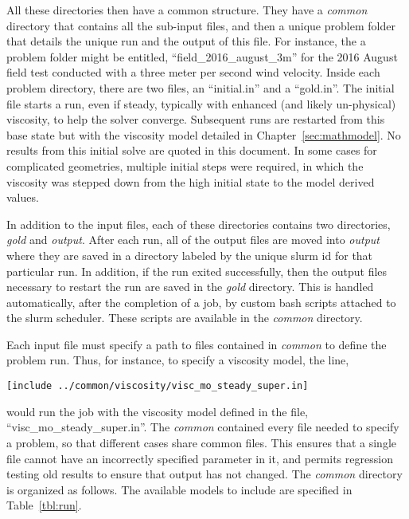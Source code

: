 All these directories then have a common structure. They have a {\it
common} directory that contains all the sub-input files, and then a
unique problem folder that details the unique run and the output
of this file. For instance, the a problem folder might be entitled,
``field\_2016\_august\_3m'' for the 2016 August field test conducted
with a three meter per second wind velocity. Inside each problem
directory, there are two files, an ``initial.in'' and a ``gold.in''. The
initial file starts a run, even if steady, typically with enhanced (and
likely un-physical) viscosity, to help the solver converge. Subsequent
runs are restarted from this base state but with the viscosity model
detailed in Chapter~\ref{sec:mathmodel}. No results from this initial
solve are quoted in this document. In some cases for complicated
geometries, multiple initial steps were required, in which the viscosity
was stepped down from the high initial state to the model derived
values. 

In addition to the input files, each of these directories contains two
directories, {\it gold} and {\it output}. After each run, all of the
output files are moved into {\it output} where they are saved in a
directory labeled by the unique slurm id for that particular run. In
addition, if the run exited successfully, then the output files
necessary to restart the run are saved in the {\it gold} directory. 
This is handled automatically, after the completion of a job, by custom
bash scripts attached to the slurm scheduler. These scripts are
available in the {\it common} directory. 

Each input file must specify a path to files contained in {\it common}
to define the problem run. Thus, for instance, to specify a viscosity
model, the line, 
\begin{verbatim}
[include ../common/viscosity/visc_mo_steady_super.in]
\end{verbatim}
would run the job with the viscosity model defined in the file,
``visc\_mo\_steady\_super.in''.  
The {\it common} contained every file needed to specify a problem, so
that different cases share common files. This ensures that a single file
cannot have an incorrectly specified parameter in it, and permits
regression testing old results to ensure that output has not changed. 
The {\it common} directory is organized as follows. The available models
to include are specified in Table~\ref{tbl:run}. 

